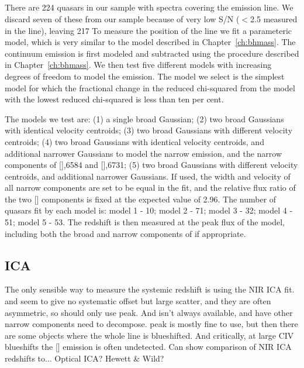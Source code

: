\subsection{\hans}

There are 224 quasars in our sample with spectra covering the \ha emission line. 
We discard seven of these from our sample because of very low S/N ($<$2.5 measured in the \ha line), leaving 217
To measure the position of the line we fit a parameteric model, which is very similar to the model described in Chapter~\ref{ch:bhmass}. 
The continuum emission is first modeled and subtracted using the procedure described in Chapter~\ref{ch:bhmass}. 
We then test five different models with increasing degrees of freedom to model the \ha emission. 
The model we select is the simplest model for which the fractional change in the reduced chi-squared from the model with the lowest reduced chi-squared is less than ten per cent. 

The models we test are: (1) a single broad Gaussian; (2) two broad Gaussians with identical velocity centroids; (3) two broad Gaussians with different velocity centroids; (4) two broad Gaussians with identical velocity centroids, and additional narrower Gaussians to model the narrow \ha emission, and the narrow components of [],6584 and [],6731; (5) two broad Gaussians with different velocity centroids, and additional narrower Gaussians. 
If used, the width and velocity of all narrow components are set to be equal in the fit, and the relative flux ratio of the two [] components is fixed at the expected value of 2.96.
The number of quasars fit by each model is: model 1 - 10; model 2 - 71; model 3 - 32; model 4 - 51; model 5 - 53. 
The redshift is then measured at the peak flux of the \ha model, including both the broad and narrow components of \ha if appropriate. 

\subsection{ICA}

The only sensible way to measure the systemic redshift is using the NIR ICA fit. 
\ha and \hb seem to give no systematic offset but large scatter, and they are often asymmetric, so should only use peak. 
And \ha isn't always available, and have other narrow components need to decompose.
 peak is mostly fine to use, but then there are some objects where the whole line is blueshifted. 
And critically, at large CIV blueshifts the [] emission is often undetected. 
Can show comparison of NIR ICA redshifts to... Optical ICA? Hewett \& Wild? 

